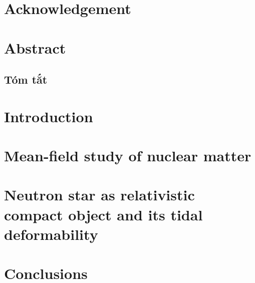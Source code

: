 \documentclass[a4paper,12pt]{report}
\theoremstyle{plain}\newtheorem{ques}{Question}
\theoremstyle{definition}\newtheorem*{ans}{Answer}
\begin{document}
        \restoregeometry
        \tableofcontents
        \setcounter{page}{1}

        \chapter*{Acknowledgement}
        \label{chap:acknowledgement}
        

        \printglossary[title={List of Abbreviations}]
        \listoftables
        \listoffigures

        \captionsetup{width=0.9\linewidth}

        \chapter*{Abstract}
        \label{chap:abstract}
        

        \begin{otherlanguage}{vietnamese}
        \chapter*{Tóm tắt}
        \label{chap:abstract_vn}
        
        \end{otherlanguage}

        \chapter{Introduction}
        \setcounter{page}{1}
        \label{chap:intro}
        

        \chapter{Mean-field study of nuclear matter}
        \label{chap:hf}
        

        \chapter{Neutron star as relativistic compact object and its tidal deformability}
        \label{chap:ns_prop}
        

%         
        
        \chapter{Conclusions}
        \label{chap:conclusion}
        

        \clearpage
        
        
\end{document}
